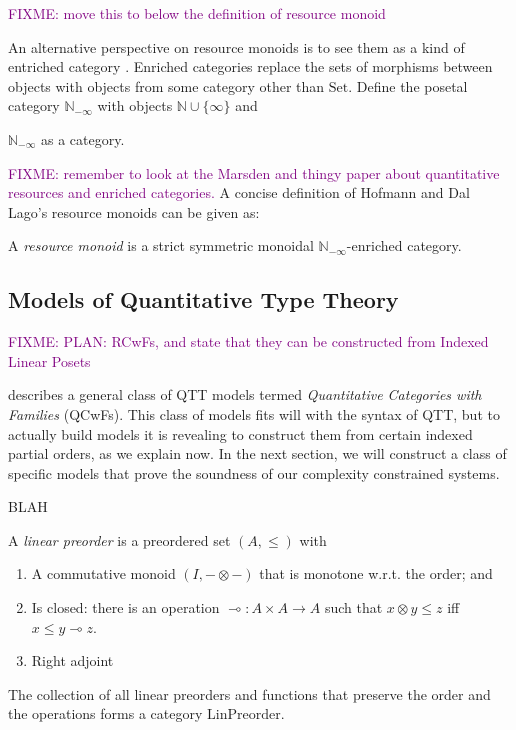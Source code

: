 \documentclass[acmsmall,review]{acmart}
\newcommand{\natinf}{\mathbb{N}_{-\infty}}
\newcommand{\Set}{\mathrm{Set}}
\newcommand{\LinPreorder}{\mathrm{LinPreorder}}
\newcommand{\bob}[1]{\textcolor{purple}{FIXME: #1}}
\begin{document}
\bob{move this to below the definition of resource monoid}

An alternative perspective on resource monoids is to see them as a
kind of entriched category \cite{kelly}. Enriched categories replace
the sets of morphisms between objects with objects from some category
other than $\Set$. Define the posetal category $\natinf$ with objects $\mathbb{N} \cup \{\infty\}$ and

$\natinf$ as a category.

\bob{remember to look at the Marsden and thingy paper about
  quantitative resources and enriched categories.}  A concise
definition of Hofmann and Dal Lago's resource monoids can be given as:
\begin{definition}
  A \emph{resource monoid} is a strict symmetric monoidal
  $\natinf$-enriched category.
\end{definition}

\subsection{Models of Quantitative Type Theory}
\label{sec:qtt-models}

\bob{PLAN: RCwFs, and state that they can be constructed from Indexed Linear Posets}

\cite{atkey18} describes a general class of QTT models termed
\emph{Quantitative Categories with Families} (QCwFs). This class of
models fits will with the syntax of QTT, but to actually build models
it is revealing to construct them from certain indexed partial orders,
as we explain now. In the next section, we will construct a class of
specific models that prove the soundness of our complexity constrained
systems.

\begin{definition}
  BLAH
\end{definition}

\begin{definition}
  A \emph{linear preorder} is a preordered set $(A, \leq)$ with
  \begin{enumerate}
  \item A commutative monoid $(I, -\otimes-)$ that is monotone
    w.r.t. the order; and
  \item Is closed: there is an operation
    $\multimap : A \times A \to A$ such that $x \otimes y \leq z$ iff
    $x \leq y \multimap z$.
  \item Right adjoint
  \end{enumerate}
  The collection of all linear preorders and functions that preserve the
  order and the operations forms a category $\LinPreorder$.
\end{definition}
\end{document}
